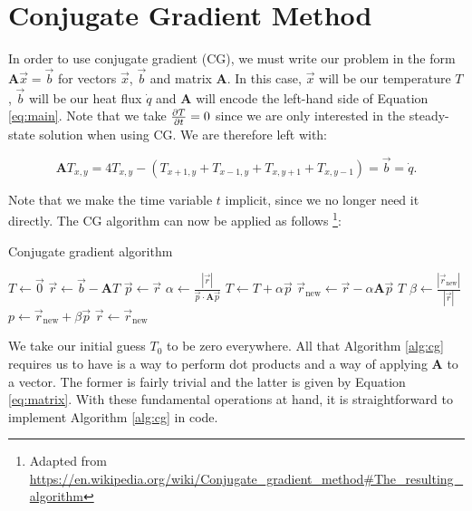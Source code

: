 \documentclass[paper=a4, fontsize=11pt]{scrartcl} %
\numberwithin{equation}{section} %
\numberwithin{figure}{section} %
\numberwithin{table}{section} %
\newcommand{\matr}[1]{\mathbf{#1}}
\begin{document}
\section{Conjugate Gradient Method}

In order to use conjugate gradient (CG), we must write our problem in the form $\matr{A}\vec{x} = \vec{b}$ for vectors $\vec{x}$, $\vec{b}$ and matrix $\matr{A}$. In this case, $\vec{x}$ will be our temperature $T$, $\vec{b}$ will be our heat flux $\dot{q}$ and $\matr{A}$ will encode the left-hand side of Equation \ref{eq:main}. Note that we take ${\partial T \over \partial t} = 0$ since we are only interested in the steady-state solution when using CG. We are therefore left with:

\begin{equation}
	\matr{A}T_{x,y} = 4T_{x,y} - (T_{x+1,y} + T_{x-1,y} + T_{x,y+1} + T_{x,y-1}) = \vec{b} = \dot{q}.
	\label{eq:matrix}
\end{equation}

Note that we make the time variable $t$ implicit, since we no longer need it directly. The CG algorithm can now be applied as follows \footnote{Adapted from \url{https://en.wikipedia.org/wiki/Conjugate_gradient_method#The_resulting_algorithm}}:

\begin{algorithm}[H]
\caption{Conjugate gradient algorithm}
\begin{algorithmic}
	\REQUIRE{$\matr{A}$, $\vec{b}$, $\epsilon$}
	\STATE $T \gets \vec{0}$
	\STATE $\vec{r} \gets \vec{b} - \matr{A}T$  
	\STATE $\vec{p} \gets \vec{r}$
	\LOOP
		\STATE $\alpha \gets \frac{|\vec{r}|}{\vec{p} \cdot \matr{A}\vec{p}}$
		\STATE $T \gets T + \alpha \vec{p}$
		\STATE $\vec{r}_{\mathrm{new}} \gets \vec{r} - \alpha\matr{A}\vec{p}$
			\RETURN $T$
		\ENDIF
		\STATE $\beta \gets \frac{|\vec{r}_{\mathrm{new}}|}{|\vec{r}|}$
		\STATE $p \gets \vec{r}_{\mathrm{new}} + \beta\vec{p}$
		\STATE $\vec{r} \gets \vec{r}_{\mathrm{new}}$
	\ENDLOOP
\end{algorithmic}
\label{alg:cg}
\end{algorithm}

We take our initial guess $T_0$ to be zero everywhere. All that Algorithm \ref{alg:cg} requires us to have is a way to perform dot products and a way of applying $\matr{A}$ to a vector. The former is fairly trivial and the latter is given by Equation \ref{eq:matrix}. With these fundamental operations at hand, it is straightforward to implement Algorithm \ref{alg:cg} in code. \linebreak
\end{document}
